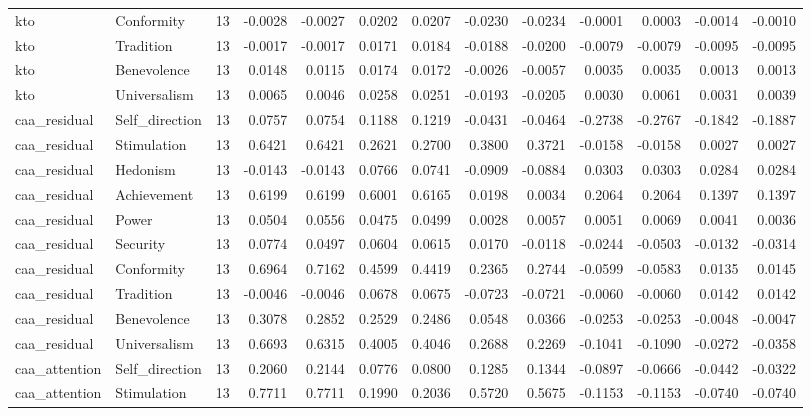 \begin{tabular}{llrrrrrrrrrrr}
kto & Conformity & 13 & -0.0028 & -0.0027 & 0.0202 & 0.0207 & -0.0230 & -0.0234 & -0.0001 & 0.0003 & -0.0014 & -0.0010 \\
kto & Tradition & 13 & -0.0017 & -0.0017 & 0.0171 & 0.0184 & -0.0188 & -0.0200 & -0.0079 & -0.0079 & -0.0095 & -0.0095 \\
kto & Benevolence & 13 & 0.0148 & 0.0115 & 0.0174 & 0.0172 & -0.0026 & -0.0057 & 0.0035 & 0.0035 & 0.0013 & 0.0013 \\
kto & Universalism & 13 & 0.0065 & 0.0046 & 0.0258 & 0.0251 & -0.0193 & -0.0205 & 0.0030 & 0.0061 & 0.0031 & 0.0039 \\
caa\_residual & Self\_direction & 13 & 0.0757 & 0.0754 & 0.1188 & 0.1219 & -0.0431 & -0.0464 & -0.2738 & -0.2767 & -0.1842 & -0.1887 \\
caa\_residual & Stimulation & 13 & 0.6421 & 0.6421 & 0.2621 & 0.2700 & 0.3800 & 0.3721 & -0.0158 & -0.0158 & 0.0027 & 0.0027 \\
caa\_residual & Hedonism & 13 & -0.0143 & -0.0143 & 0.0766 & 0.0741 & -0.0909 & -0.0884 & 0.0303 & 0.0303 & 0.0284 & 0.0284 \\
caa\_residual & Achievement & 13 & 0.6199 & 0.6199 & 0.6001 & 0.6165 & 0.0198 & 0.0034 & 0.2064 & 0.2064 & 0.1397 & 0.1397 \\
caa\_residual & Power & 13 & 0.0504 & 0.0556 & 0.0475 & 0.0499 & 0.0028 & 0.0057 & 0.0051 & 0.0069 & 0.0041 & 0.0036 \\
caa\_residual & Security & 13 & 0.0774 & 0.0497 & 0.0604 & 0.0615 & 0.0170 & -0.0118 & -0.0244 & -0.0503 & -0.0132 & -0.0314 \\
caa\_residual & Conformity & 13 & 0.6964 & 0.7162 & 0.4599 & 0.4419 & 0.2365 & 0.2744 & -0.0599 & -0.0583 & 0.0135 & 0.0145 \\
caa\_residual & Tradition & 13 & -0.0046 & -0.0046 & 0.0678 & 0.0675 & -0.0723 & -0.0721 & -0.0060 & -0.0060 & 0.0142 & 0.0142 \\
caa\_residual & Benevolence & 13 & 0.3078 & 0.2852 & 0.2529 & 0.2486 & 0.0548 & 0.0366 & -0.0253 & -0.0253 & -0.0048 & -0.0047 \\
caa\_residual & Universalism & 13 & 0.6693 & 0.6315 & 0.4005 & 0.4046 & 0.2688 & 0.2269 & -0.1041 & -0.1090 & -0.0272 & -0.0358 \\
caa\_attention & Self\_direction & 13 & 0.2060 & 0.2144 & 0.0776 & 0.0800 & 0.1285 & 0.1344 & -0.0897 & -0.0666 & -0.0442 & -0.0322 \\
caa\_attention & Stimulation & 13 & 0.7711 & 0.7711 & 0.1990 & 0.2036 & 0.5720 & 0.5675 & -0.1153 & -0.1153 & -0.0740 & -0.0740 \\

\end{tabular}
